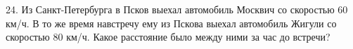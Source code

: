 24. Из Санкт-Петербурга в Псков выехал автомобиль Москвич со скоростью 60 км/ч. В то же время навстречу ему из Пскова выехал автомобиль Жигули со скоростью 80 км/ч. Какое расстояние было между ними за час до встречи?\\
